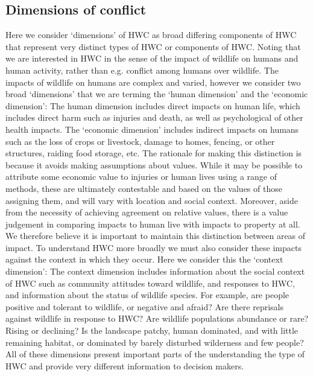 \documentclass[fleqn,10pt]{olplainarticle}
\begin{document}
\subsection*{Dimensions of conflict}
Here we consider ‘dimensions’ of HWC as broad differing components of HWC that represent very distinct types of HWC or components of HWC. Noting that we are interested in HWC in the sense of the impact of wildlife on humans and human activity, rather than e.g. conflict among humans over wildlife. The impacts of wildlife on humans are complex and varied, however we consider two broad ‘dimensions’ that we are terming the ‘human dimension’ and the ‘economic dimension’:
The human dimension includes direct impacts on human life, which includes direct harm such as injuries and death, as well as psychological of other health impacts.
The ‘economic dimension’ includes  indirect impacts on humans such as the loss of crops or livestock, damage to homes, fencing, or other structures, raiding food storage, etc.
The rationale for making this distinction is because it avoids making assumptions about values. While it may be possible to attribute some economic value to injuries or human lives using a range of methods, these are ultimately contestable and based on the values of those assigning them, and will vary with location and social context. Moreover, aside from the necessity of achieving agreement on relative values, there is a value judgement in comparing impacts to human live with impacts to property at all. We therefore believe it is important to maintain this distinction between areas of impact.
 To understand HWC more broadly we must also consider these impacts against the context in which they occur. Here we consider this the ‘context dimension’:
The context dimension includes information about the social context of HWC such as community attitudes toward wildlife, and responses to HWC, and information about the status of wildlife species.
For example, are people positive and tolerant to wildlife, or negative and afraid? Are there reprisals against wildlife in response to HWC? Are wildlife populations abundance or rare? Rising or declining? Is the landscape patchy, human dominated, and with little remaining habitat, or dominated by barely disturbed wilderness and few people? All of these dimensions present important parts of the understanding the type of HWC and provide very different information to decision makers.
\end{document}
